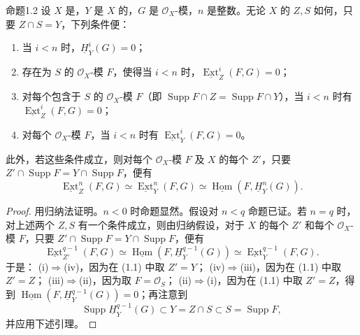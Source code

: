 \begin{SGAresult}{命题}{1.2}
设 $X$ 是，$Y$ 是 $X$ 的，$G$ 是 $\mathscr O_X$-模，$n$ 是整数。无论 $X$ 的 $Z,S$ 如何，只要 $Z\cap S=Y$，下列条件便：
\begin{enumerate}
\item[(i)] 当 $i<n$ 时，$\underline H^i_Y(G)=0$；
\item[(ii)] 存在为 $S$ 的 $\mathscr O_X$-模 $F$，使得当 $i<n$ 时，$\underline{\operatorname{Ext}}^i_Z(F,G)=0$；
\item[(iii)] 对每个包含于 $S$ 的 $\mathscr O_X$-模 $F$（即 $\operatorname{Supp}F\cap Z=\operatorname{Supp}F\cap Y$），当 $i<n$ 时有 $\underline{\operatorname{Ext}}^i_Z(F,G)=0$；
\item[(iv)] 对每个 $\mathscr O_X$-模 $F$，当 $i<n$ 时有 $\underline{\operatorname{Ext}}^i_Y(F,G)=0$。
\end{enumerate}
此外，若这些条件成立，则对每个 $\mathscr O_X$-模 $F$ 及 $X$ 的每个 $Z'$，只要 $Z'\cap\operatorname{Supp}F=Y\cap\operatorname{Supp}F$，便有
\[\underline{\operatorname{Ext}}^n_Z(F,G)\simeq\underline{\operatorname{Ext}}^n_Y(F,G)\simeq\underline{\operatorname{Hom}}(F,\underline H^n_Y(G)).\]
\end{SGAresult}
\begin{proof}
用归纳法证明。$n<0$ 时命题显然。假设对 $n<q$ 命题已证。若 $n=q$ 时，对上述两个 $Z,S$ 有一个条件成立，则由归纳假设，对于 $X$ 的每个 $Z'$ 和每个 $\mathscr O_X$-模 $F$，只要 $Z'\cap\operatorname{Supp}F=Y\cap\operatorname{Supp}F$，便有
\[
\underline{\operatorname{Ext}}^{q-1}_{Z'}(F,G)\simeq\underline{\operatorname{Hom}}(F,\underline H^{q-1}_Y(G))\simeq\underline{\operatorname{Ext}}^{q-1}_Y(F,G).\tag{1.1}
\]
于是：
(i)$\Rightarrow$(iv)，因为在 (1.1) 中取 $Z'=Y$；
(iv)$\Rightarrow$(iii)，因为在 (1.1) 中取 $Z'=Z$；
(iii)$\Rightarrow$(ii)，因为取 $F=\mathscr O_S$；
(ii)$\Rightarrow$(i)，因为在 (1.1) 中取 $Z'=Z$，得到 $\underline{\operatorname{Hom}}(F,\underline H^{q-1}_Y(G))=0$；再注意到
\[\operatorname{Supp}\underline H^{q-1}_Y(G)\subset Y=Z\cap S\subset S=\operatorname{Supp}F,\]
并应用下述引理。
\end{proof}
